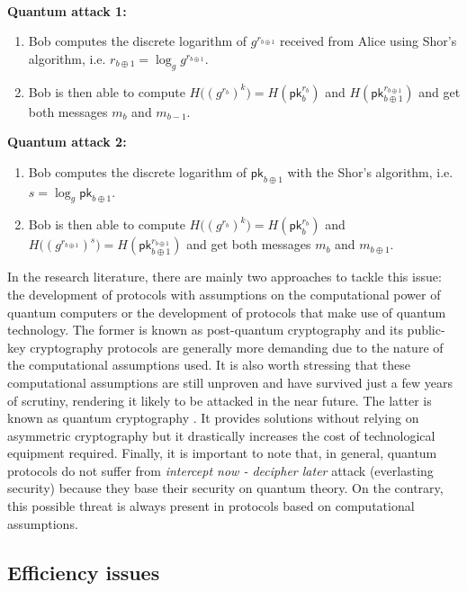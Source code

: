 \

\textbf{Quantum attack 1:}
\begin{enumerate}
    \item Bob computes the discrete logarithm of $g^{r_{b\oplus 1}}$ received from Alice using Shor's algorithm, i.e. $r_{b\oplus 1} = \log_g g^{r_{b\oplus 1}}$.
    \item Bob is then able to compute $H\big((g^{r_b})^k\big) = H(\mathsf{pk}_b^{r_b})$ and $H(\mathsf{pk}_{b\oplus 1}^{r_{b\oplus 1}})$ and get both messages $m_b$ and $m_{b-1}$.
\end{enumerate}

\textbf{Quantum attack 2:}
\begin{enumerate}
    \item Bob computes the discrete logarithm of $\mathsf{pk}_{b\oplus 1}$ with the Shor's algorithm, i.e. $s = \log_g \mathsf{pk}_{b\oplus 1}$.
    \item Bob is then able to compute $H\big((g^{r_b})^k\big) = H(\mathsf{pk}_b^{r_b})$ and $H\big((g^{r_{b\oplus 1}})^s\big) = H(\mathsf{pk}_{b\oplus 1}^{r_{b\oplus 1}})$ and get both messages $m_b$ and $m_{b\oplus 1}$.
\end{enumerate}

In the research literature, there are mainly two approaches to tackle this issue: the development of protocols with assumptions on the computational power of quantum computers or the development of protocols that make use of quantum technology. The former is known as post-quantum cryptography \cite{Bernstein2017} and its public-key cryptography protocols are generally more demanding due to the nature of the computational assumptions used. It is also worth stressing that these computational assumptions are still unproven and have survived just a few years of scrutiny, rendering it likely to be attacked in the near future. The latter is known as quantum cryptography \cite{Pirandola20}. It provides solutions without relying on asymmetric cryptography but it drastically increases the cost of technological equipment required. Finally, it is important to note that, in general, quantum protocols do not suffer from \textit{intercept now - decipher later} attack (everlasting security) because they base their security on quantum theory. On the contrary, this possible threat is always present in protocols based on computational assumptions.


\subsection{Efficiency issues}

